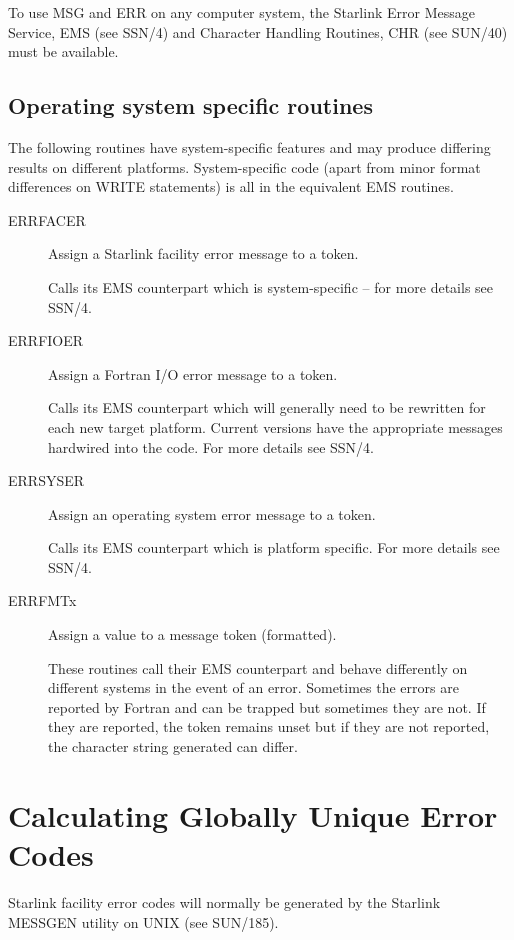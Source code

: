 \documentclass[twoside,11pt]{article}
\newcommand{\latex}[1]{#1}
\newcommand{\xref}[3]{#1}
\newcommand{\xlabel}[1]{}
\renewcommand{\_}{\texttt{\symbol{95}}}
\begin{document}
To use MSG and ERR on any computer system, the Starlink Error Message Service,
\xref{EMS}{ssn4}{abstract} \latex{(see SSN/4)}
and Character Handling Routines, 
\xref{CHR}{sun40}{abstract} \latex{(see SUN/40)}
must be available.


\subsection{\xlabel{operating_system_specific_routines}Operating system specific routines \label{dep_sect}}
The following routines have system-specific features and may produce differing
results on different platforms. System-specific code (apart from minor format
differences on WRITE statements) is all in the equivalent EMS routines.
\begin{description}
\item [ERR\_FACER] Assign a Starlink facility error message to a token.

Calls its EMS counterpart which is system-specific -- for more details see 
\xref{SSN/4}{ssn4}{operating_system_specific_routines}.
\item [ERR\_FIOER] Assign a Fortran I/O error message to a token.

Calls its EMS counterpart which will generally need to be rewritten for each 
new target platform.
Current versions have the appropriate messages hardwired into the code.
For more details see \xref{SSN/4}{ssn4}{operating_system_specific_routines}.
\item [ERR\_SYSER] Assign an operating system error message to a token.

Calls its EMS counterpart which is platform specific.
For more details see \xref{SSN/4}{ssn4}{operating_system_specific_routines}.
\item [ERR\_FMTx] Assign a value to a message token (formatted).

These routines call their EMS counterpart and behave differently on different 
systems in the event of an error. 
Sometimes the errors are reported by Fortran and can be trapped but 
sometimes they are not. If they are reported, the token remains unset but
if they are not reported, the character string generated can differ.
\end {description}

\section{\xlabel{calculating_globally_unique_error_codes}Calculating Globally Unique Error Codes \label{stat_sect}}
Starlink facility error codes will normally be generated by the Starlink
\xref{MESSGEN}{sun185}{} utility on UNIX\latex{ (see SUN/185)}.
\end{document}
